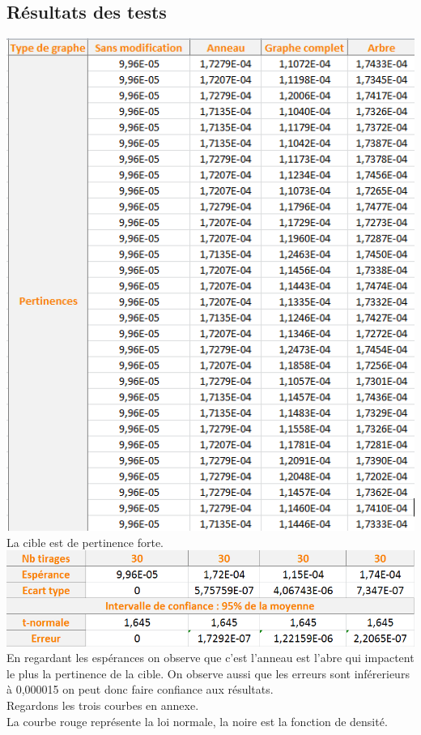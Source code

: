 \documentclass[a4paper,11pt]{article}
\begin{document}
	\subsection{Résultats des tests}
		\includegraphics[scale = 0.5]{Captures/ranking2.PNG}\\
		La cible est de pertinence forte. \\
		\includegraphics[scale = 0.5]{Captures/ranking3.PNG}\\
		En regardant les espérances on observe que c'est l'anneau est l'abre qui impactent le plus la pertinence de la cible.
		On observe aussi que les erreurs sont inférerieurs à 0,000015 on peut donc faire confiance aux résultats.\\
		Regardons les trois courbes en annexe.\\
		La courbe rouge représente la loi normale, la noire est la fonction de densité. 
		
\end{document}
